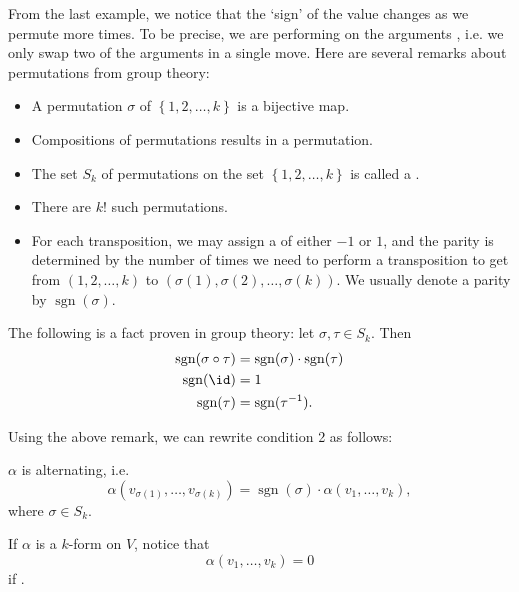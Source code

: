 \documentclass[notoc,notitlepage]{tufte-book}
\DeclareMathOperator{\sgn}{sgn}
\begin{document}
\begin{remark}[Permutations]\label{remark:permutations}
  From the last example, we notice that the `sign' of the value changes
  as we permute more times. To be precise, we are performing 
  on the arguments
  ,
  i.e. we only swap two of the arguments in a single move.
  Here are several remarks about permutations from group theory:
  \begin{itemize}
    \item A permutation $\sigma$ of $\left\{ 1, 2, \ldots, k \right\}$ is a
      bijective map.
    \item Compositions of permutations results in a permutation.
    \item The set $S_k$ of permutations on the set $\left\{ 1, 2, \ldots, k \right\}$
      is called a .
    \item There are $k!$ such permutations.
    \item For each transposition, we may assign a  of either $-1$ or $1$,
      and the parity is determined by the number of times we need to perform a transposition
      to get from $(1, 2, \ldots, k)$ to $(\sigma(1), \sigma(2), \ldots, \sigma(k))$. We
      usually denote a parity by $\sgn(\sigma)$.
  \end{itemize}

  The following is a fact proven in group theory: let $\sigma, \tau \in S_k$. Then
  \begin{align*}
    \sgn(\sigma \circ \tau) &= \sgn(\sigma) \cdot \sgn(\tau) \\
    \sgn(\id) &= 1 \\
    \sgn(\tau) &= \sgn(\tau^{-1}).
  \end{align*}
\end{remark}

Using the above remark, we can rewrite condition 2 as follows:

\begin{note}
  $\alpha$ is alternating, i.e.
  \begin{equation*}
    \alpha(v_{\sigma(1)}, \ldots, v_{\sigma(k)}) = \sgn(\sigma) \cdot \alpha(v_1, \ldots, v_k),
  \end{equation*}
  where $\sigma \in S_k$.
\end{note}

\begin{remark}
  If $\alpha$ is a $k$-form on $V$, notice that
  \begin{equation*}
    \alpha(v_1, \ldots, v_k) = 0
  \end{equation*}
  if .
\end{remark}
\end{document}
